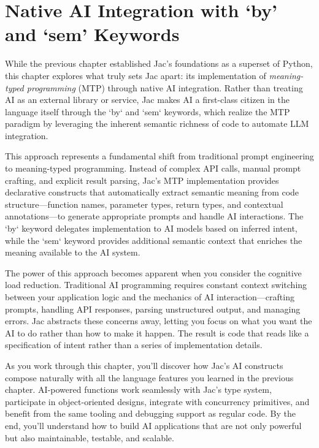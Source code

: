 \mtcaddchapter
\chapter{Native AI Integration with `by' and `sem' Keywords}
\minitoc

While the previous chapter established Jac's foundations as a superset of Python, this chapter explores what truly sets Jac apart: its implementation of \emph{meaning-typed programming} (MTP) through native AI integration. Rather than treating AI as an external library or service, Jac makes AI a first-class citizen in the language itself through the `by` and `sem` keywords, which realize the MTP paradigm by leveraging the inherent semantic richness of code to automate LLM integration.

This approach represents a fundamental shift from traditional prompt engineering to meaning-typed programming. Instead of complex API calls, manual prompt crafting, and explicit result parsing, Jac's MTP implementation provides declarative constructs that automatically extract semantic meaning from code structure—function names, parameter types, return types, and contextual annotations—to generate appropriate prompts and handle AI interactions. The `by` keyword delegates implementation to AI models based on inferred intent, while the `sem` keyword provides additional semantic context that enriches the meaning available to the AI system.

The power of this approach becomes apparent when you consider the cognitive load reduction. Traditional AI programming requires constant context switching between your application logic and the mechanics of AI interaction—crafting prompts, handling API responses, parsing unstructured output, and managing errors. Jac abstracts these concerns away, letting you focus on what you want the AI to do rather than how to make it happen. The result is code that reads like a specification of intent rather than a series of implementation details.

As you work through this chapter, you'll discover how Jac's AI constructs compose naturally with all the language features you learned in the previous chapter. AI-powered functions work seamlessly with Jac's type system, participate in object-oriented designs, integrate with concurrency primitives, and benefit from the same tooling and debugging support as regular code. By the end, you'll understand how to build AI applications that are not only powerful but also maintainable, testable, and scalable.

